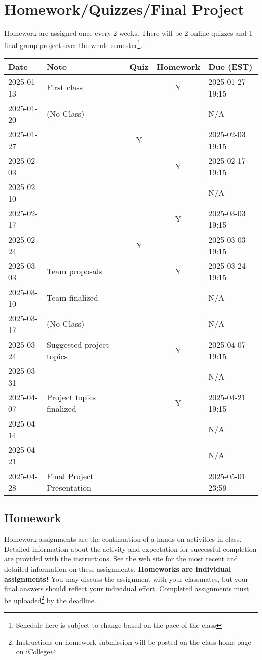 \documentclass[a4paper, 12pt]{article}
\begin{document}
\section{Homework/Quizzes/Final Project}
Homework are assigned once every 2 weeks. There will be 2 online quizzes and 1 final group project over the whole semester\footnote{Schedule here is subject to change based on the pace of the class}.
\begin{center}
  \begin{tabular}{ l|l|c|c|l }
      \hline			
      Date & Note & Quiz & Homework & Due (EST)\\
      \hline
      2025-01-13 & First class &  & Y & 2025-01-27 19:15 \\
      2025-01-20 & (No Class) &  &  & N/A \\
      2025-01-27 &  & Y &  & 2025-02-03 19:15 \\
      2025-02-03 &  &  & Y & 2025-02-17 19:15 \\
      2025-02-10 &  &  &  & N/A \\
      2025-02-17 &  &  & Y & 2025-03-03 19:15 \\
      2025-02-24 &   & Y &  & 2025-03-03 19:15 \\
      2025-03-03 & Team proposals &  & Y & 2025-03-24 19:15 \\
      2025-03-10 & Team finalized &  &  & N/A \\
      2025-03-17 & (No Class) &  &  & N/A \\
      2025-03-24 & Suggested project topics &  & Y & 2025-04-07 19:15 \\
      2025-03-31 &  &  &  & N/A \\
      2025-04-07 & Project topics finalized &  & Y & 2025-04-21 19:15 \\
      2025-04-14 &  &  &  & N/A \\
      2025-04-21 &  &  &  & N/A \\
      2025-04-28 & Final Project Presentation &  &  & 2025-05-01 23:59 \\
      \hline  
  \end{tabular}
\end{center}

\subsection{Homework}
Homework assignments are the continuation of a hands-on activities in class. Detailed information about the activity and expectation for successful completion are provided with the instructions. See the web site for the most recent and detailed information on these assignments. \textbf{Homeworks are individual assignments!} You may discuss the assignment with your classmates, but your ﬁnal answers should reﬂect your individual eﬀort. Completed assignments must be uploaded\footnote{Instructions on homework submission will be posted on the class home page on iCollege} by the deadline.
\end{document}
